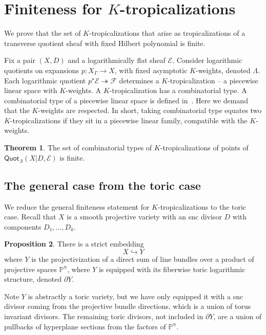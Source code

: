 \documentclass[11pt]{amsart}
\theoremstyle{definition}
\theoremstyle{definition}
\newtheorem{theorem}{Theorem}[subsection]
\newtheorem{proposition}[theorem]{Proposition}
\begin{document}
\section{Finiteness for $K$-tropicalizations}\label{sec: finiteness-K}

We prove that the set of $K$-tropicalizations that arise as tropicalizations of a transverse quotient sheaf with fixed Hilbert polynomial is finite. 

Fix a pair $(X,D)$ and a logarithmically flat sheaf $\mathcal E$. Consider logarithmic quotients on expansions $p\colon X_\Gamma\to X$, with fixed asymptotic $K$-weights, denoted $\Lambda$. Each logarithmic quotient $p^\star\mathcal E\twoheadrightarrow \mathcal F$ determines a $K$-tropicalization -- a piecewise linear space with $K$-weights. A $K$-tropicalization has a combinatorial type. A combinatorial type of a piecewise linear space is defined in~\cite{Logquot}. Here we demand that the $K$-weights are respected. In short, taking combinatorial type equates two $K$-tropicalizations if they sit in a piecewise linear family, compatible with the $K$-weights. 

\begin{theorem}\label{thm: combinatorial-boundedness}
The set of combinatorial types of $K$-tropicalizations of points of $\mathsf{Quot}_\Lambda(X|D,\mathcal E)$ is finite. 
\end{theorem}

\subsection{The general case from the toric case} We reduce the general finiteness statement for $K$-tropicalizations to the toric case. Recall that $X$ is a smooth projective variety with an snc divisor $D$ with components $D_1,\ldots, D_k$.

\begin{proposition}\label{prop: global-toric-embedding}
There is a strict embedding
\[
X\hookrightarrow Y
\]
where $Y$ is the projectivization of a direct sum of line bundles over a product of projective spaces $\mathbb P^{\underline n}$, where $Y$ is equipped with its fiberwise toric logarithmic structure, denoted $\partial Y$.
\end{proposition}

Note $Y$ is abstractly a toric variety, but we have only equipped it with a snc divisor coming from the projective bundle directions, which is a union of torus invariant divisors. The remaining toric divisors, not included in $\partial Y$, are a union of pullbacks of hyperplane sections from the factors of $\mathbb P^{\underline n}$. 
\end{document}
